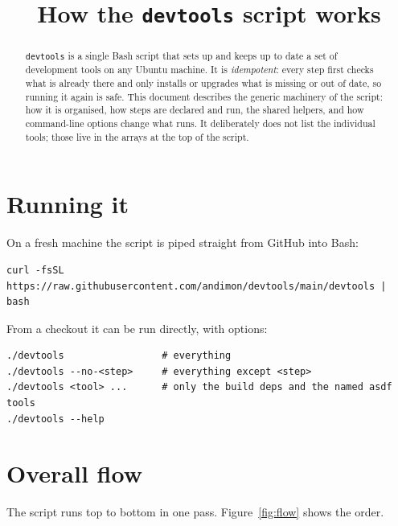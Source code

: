 \documentclass[11pt,a4paper]{article}
\title{How the \texttt{devtools} script works}
\date{}
\newcommand{\cmd}[1]{\texttt{#1}}
\begin{document}
\maketitle

\begin{abstract}
\noindent \cmd{devtools} is a single Bash script that sets up and keeps up to date a
set of development tools on any Ubuntu machine. It is \emph{idempotent}: every step
first checks what is already there and only installs or upgrades what is missing or
out of date, so running it again is safe. This document describes the generic
machinery of the script: how it is organised, how steps are declared and run, the
shared helpers, and how command-line options change what runs. It deliberately does
not list the individual tools; those live in the arrays at the top of the script.
\end{abstract}

\tableofcontents

\section{Running it}

On a fresh machine the script is piped straight from GitHub into Bash:

\begin{lstlisting}
curl -fsSL https://raw.githubusercontent.com/andimon/devtools/main/devtools | bash
\end{lstlisting}

\noindent From a checkout it can be run directly, with options:

\begin{lstlisting}
./devtools                 # everything
./devtools --no-<step>     # everything except <step>
./devtools <tool> ...      # only the build deps and the named asdf tools
./devtools --help
\end{lstlisting}

\section{Overall flow}

The script runs top to bottom in one pass. Figure~\ref{fig:flow} shows the order.
\end{document}
